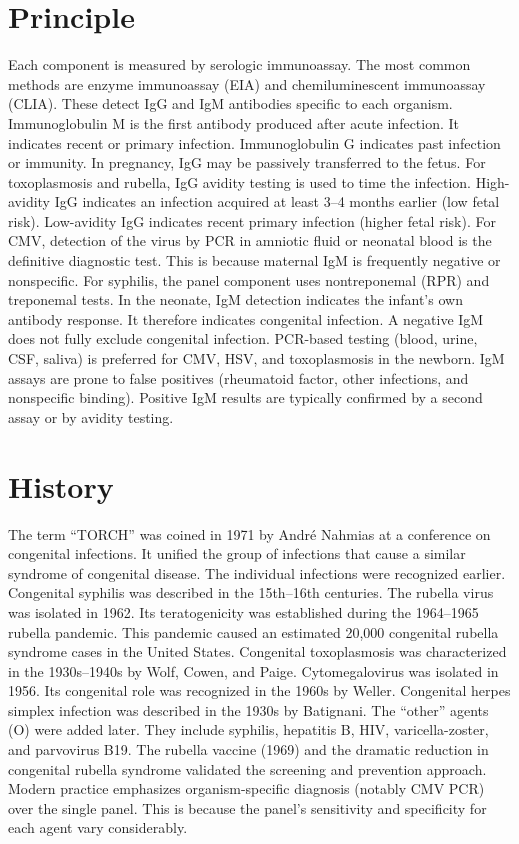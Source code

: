 \section*{Principle}
Each component is measured by serologic immunoassay. The most common methods are enzyme immunoassay (EIA) and chemiluminescent immunoassay (CLIA). These detect IgG and IgM antibodies specific to each organism. Immunoglobulin M is the first antibody produced after acute infection. It indicates recent or primary infection. Immunoglobulin G indicates past infection or immunity. In pregnancy, IgG may be passively transferred to the fetus. For toxoplasmosis and rubella, IgG avidity testing is used to time the infection. High-avidity IgG indicates an infection acquired at least 3--4 months earlier (low fetal risk). Low-avidity IgG indicates recent primary infection (higher fetal risk). For CMV, detection of the virus by PCR in amniotic fluid or neonatal blood is the definitive diagnostic test. This is because maternal IgM is frequently negative or nonspecific. For syphilis, the panel component uses nontreponemal (RPR) and treponemal tests. In the neonate, IgM detection indicates the infant's own antibody response. It therefore indicates congenital infection. A negative IgM does not fully exclude congenital infection. PCR-based testing (blood, urine, CSF, saliva) is preferred for CMV, HSV, and toxoplasmosis in the newborn. IgM assays are prone to false positives (rheumatoid factor, other infections, and nonspecific binding). Positive IgM results are typically confirmed by a second assay or by avidity testing.

\section*{History}
The term ``TORCH'' was coined in 1971 by Andr\'{e} Nahmias at a conference on congenital infections. It unified the group of infections that cause a similar syndrome of congenital disease. The individual infections were recognized earlier. Congenital syphilis was described in the 15th--16th centuries. The rubella virus was isolated in 1962. Its teratogenicity was established during the 1964--1965 rubella pandemic. This pandemic caused an estimated 20,000 congenital rubella syndrome cases in the United States. Congenital toxoplasmosis was characterized in the 1930s--1940s by Wolf, Cowen, and Paige. Cytomegalovirus was isolated in 1956. Its congenital role was recognized in the 1960s by Weller. Congenital herpes simplex infection was described in the 1930s by Batignani. The ``other'' agents (O) were added later. They include syphilis, hepatitis B, HIV, varicella-zoster, and parvovirus B19. The rubella vaccine (1969) and the dramatic reduction in congenital rubella syndrome validated the screening and prevention approach. Modern practice emphasizes organism-specific diagnosis (notably CMV PCR) over the single panel. This is because the panel's sensitivity and specificity for each agent vary considerably.

